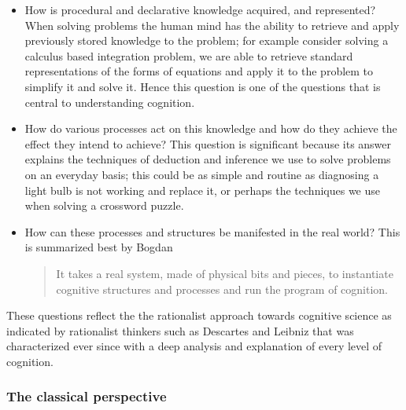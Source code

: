 \begin{itemize}
\item How is procedural and declarative knowledge acquired, and
represented? When solving problems the human mind has the ability to
retrieve and apply previously stored knowledge to the problem; for
example consider solving a calculus based integration problem, we are
able to retrieve standard representations of the forms of equations
and apply it to the problem to simplify it and solve it. Hence this
question is one of the questions that is central to understanding
cognition.
\item How do various processes act on this knowledge and how do they
achieve the effect they intend to achieve? This question is
significant because its answer explains the techniques of deduction
and inference we use to solve
problems on an everyday basis; this could be as simple and routine as diagnosing a
light bulb is not working and replace it, or perhaps the techniques we
use when solving a crossword puzzle.
\item How can these processes and structures be manifested in the real
world? This is summarized best by Bogdan\cite{Bogdan:1993aa}
\begin{quote}
It takes a real system, made of physical bits and pieces, to 
instantiate cognitive structures and processes and run the program of 
cognition.
\end{quote}

\end{itemize}

These questions reflect the the rationalist approach towards cognitive
science as indicated by rationalist thinkers such as Descartes and
Leibniz \cite{Bogdan:1993aa} that was characterized ever since with a
deep analysis and explanation of every level of cognition. 







\subsubsection{The classical perspective}

